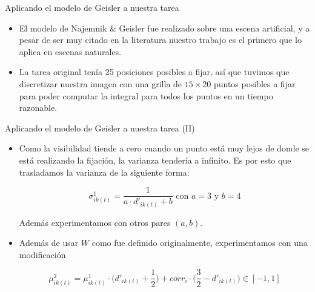 \documentclass[compress]{beamer}
\begin{document}
\begin{frame}{Aplicando el modelo de Geisler a nuestra tarea}
\begin{itemize}
\item El modelo de Najemnik \& Geisler fue realizado sobre una escena artificial, y a pesar de ser muy citado en la literatura nuestro trabajo es el primero que lo aplica en escenas naturales. 
\item La tarea original tenía 25 posiciones posibles a fijar, así que tuvimos que discretizar nuestra imagen con una grilla de $15 \times 20$ puntos posibles a fijar para poder computar la integral para todos los puntos en un tiempo razonable.
\end{itemize}
\end{frame}

\begin{frame}{Aplicando el modelo de Geisler a nuestra tarea (II)}
\begin{itemize}
\item Como la visibilidad tiende a cero cuando un punto está muy lejos de donde se está realizando la fijación, la varianza tendería a infinito. Es por esto que trasladamos la varianza de la siguiente forma:

$$ \sigma_{ik(t)}^1 = \displaystyle\frac{1}{a \cdot d'_{ik(t)} + b} \text{ con } a = 3 \text{ y } b = 4$$ 

Además experimentamos con otros pares $(a,b)$.
\item Además de usar $W$ como fue definido originalmente, experimentamos con una modificación 

$$\mu_{ik(t)}^2 = \mu^1_{ik(t)} \cdot \Big(d'_{ik(t)} + \dfrac{1}{2}\Big) + corr_{i} \cdot \Big(\dfrac{3}{2} - d'_{ik(t)}\Big) \in [-1, 1]$$

\end{itemize}
\end{frame}
\end{document}
